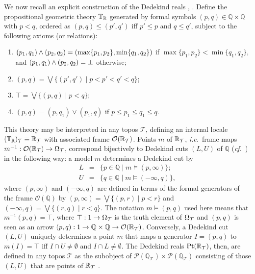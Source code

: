\documentclass[12pt]{article}
\newcommand{\Q}{\mathbb{Q}}
\newcommand{\raw}{\rightarrow} \newcommand{\rat}{\mapsto}
\newcommand{\x}{\times} \newcommand{\hb}{\hbar}
\newcommand{\inv}{^{-1}}
\newcommand{\CO}{{\mathcal O}} \newcommand{\CP}{{\mathcal P}}
\newcommand{\CT}{{\mathcal T}} \newcommand{\CV}{{\mathcal V}}
\newcommand{\T}{{\mathbb T}} \newcommand{\Z}{{\mathbb Z}}
\newcommand{\ie}{\textit{i.e.}}
\begin{document}
We now  recall an explicit construction of the Dedekind reals
\cite{fourmangrayson}, \cite[D4.7.4 \&\ D4.7.5]{johnstone02b}.
Define the propositional geometric theory $\T_{\R}$
 generated by formal symbols $(p,q)\in\Q\x\Q$ 
 with $p<q$, ordered as $(p,q)\leqslant (p',q')$ iff $p'\leqslant p$ and $q\leqslant q'$,
  subject to the following axioms (or relations):
 \begin{enumerate}

\item $(p_1,q_1)\wedge (p_2,q_2)=(\max\{p_1,p_2\},\min\{q_1,q_2\})$ if
$\max\{p_1,p_2\}<\min\{q_1,q_2\}$, and $(p_1,q_1)\wedge (p_2,q_2)=\bot$ otherwise;
\item $(p,q)=\bigvee \{(p',q')\mid p<p'<q'<q\}$;
\item $\top=\bigvee \{(p,q)\mid p<q\}$;
\item $(p,q)=(p,q_1)\vee (p_1,q)$ if $p\leqslant p_1\leqslant q_1\leqslant q$.
\end{enumerate}

This theory may be interpreted in any topos $\CT$, defining an internal locale
$(\T_{\R})_{\CT}\equiv \R_{\CT}$ with associated frame $\CO(\R_{\CT})$.
Points $m$ of  $\R_{\CT}$, \ie\  frame maps
$m\inv:\CO(\R_{\CT})\raw\Om_{\CT}$,  correspond bijectively to Dedekind cuts $(L,U)$ of
$\Q$ ({\it cf.}\ \cite[p.\ 321]{maclanemoerdijk92}) in the following way: a
model $m$ determines a Dedekind cut by
\begin{eqnarray}
L&=& \{p\in\Q\mid m\models (p,\infty) \};\label{eq21}\\
U&=& \{q\in\Q\mid m\models  (-\infty,q)\},\label{eq22}
\end{eqnarray}
where $(p,\infty)$ and $(-\infty,q)$ are defined in terms of the formal generators of the frame
$\mathcal{O}(\Q)$ by $(p,\infty)=\bigvee \{(p,r)\mid p<r\}$ and $(-\infty,q)=\bigvee \{(r,q)\mid r<q\}$. 
The notation $m\models (p,q)$ used here means that $m\inv (p,q)=\top$, where
$\top:1\raw\Om_{\CT}$ is the truth element of $\Om_{\CT}$ and $(p,q)$ is seen as an arrow
$(p,q):1\raw \Q\x\Q\raw \CO(\R_{\CT})$.
Conversely, a Dedekind cut $(L,U)$ uniquely determines a point $m$
that maps a  generator $I=(p,q)$ to
$m(I)=\top$ iff $I\cap U\neq \emptyset$ and $I\cap L\neq \emptyset$.
The Dedekind reals  $\mathrm{Pt}(\R_{\CT})$, then,
 are defined in any topos $\CT$
 as the subobject of \hbox{$\CP(\Q_{\CT})\x\CP(\Q_{\CT})$} consisting of those
$(L,U)$ that are points of $\R_{\CT}$  \cite{maclanemoerdijk92}.
\end{document}

